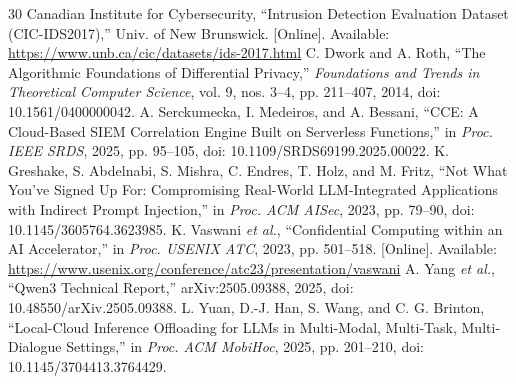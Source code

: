 \documentclass[conference,letterpaper]{IEEEtran}
\begin{document}
\begin{thebibliography}{30}
 Canadian Institute for Cybersecurity, ``Intrusion Detection Evaluation Dataset (CIC-IDS2017),'' Univ. of New Brunswick. [Online]. Available: \url{https://www.unb.ca/cic/datasets/ids-2017.html}
 C. Dwork and A. Roth, ``The Algorithmic Foundations of Differential Privacy,'' \emph{Foundations and Trends in Theoretical Computer Science}, vol. 9, nos. 3--4, pp. 211--407, 2014, doi: 10.1561/0400000042.
 A. Serckumecka, I. Medeiros, and A. Bessani, ``CCE: A Cloud-Based SIEM Correlation Engine Built on Serverless Functions,'' in \emph{Proc. IEEE SRDS}, 2025, pp. 95--105, doi: 10.1109/SRDS69199.2025.00022.
 K. Greshake, S. Abdelnabi, S. Mishra, C. Endres, T. Holz, and M. Fritz, ``Not What You've Signed Up For: Compromising Real-World LLM-Integrated Applications with Indirect Prompt Injection,'' in \emph{Proc. ACM AISec}, 2023, pp. 79--90, doi: 10.1145/3605764.3623985.
 K. Vaswani \emph{et al.}, ``Confidential Computing within an AI Accelerator,'' in \emph{Proc. USENIX ATC}, 2023, pp. 501--518. [Online]. Available: \url{https://www.usenix.org/conference/atc23/presentation/vaswani}
 A. Yang \emph{et al.}, ``Qwen3 Technical Report,'' arXiv:2505.09388, 2025, doi: 10.48550/arXiv.2505.09388.
 L. Yuan, D.-J. Han, S. Wang, and C. G. Brinton, ``Local-Cloud Inference Offloading for LLMs in Multi-Modal, Multi-Task, Multi-Dialogue Settings,'' in \emph{Proc. ACM MobiHoc}, 2025, pp. 201--210, doi: 10.1145/3704413.3764429.
\end{thebibliography}
\end{document}
